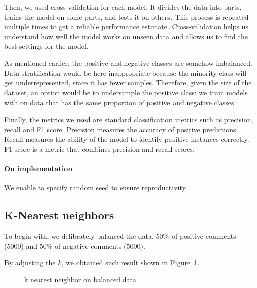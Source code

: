 \documentclass{article}
\begin{document}
Then, we used cross-validation for each model. It divides the data into parts, trains the model on some parts, and tests it on others. This process is repeated multiple times to get a reliable performance estimate. Cross-validation helps us understand how well the model works on unseen data and allows us to find the best settings for the model.

As mentioned earlier, the positive and negative classes are somehow imbalanced. Data stratification would be here inappropriate because the minority class will get underrepresented, since it has fewer samples.
Therefore, given the size of the dataset, an option would be to undersample the positive class: we train models with on data that has the same proportion of positive and negative classes.

Finally, the metrics we used are standard classification metrics such as precision, recall and F1 score.
Precision measures the accuracy of positive predictions. Recall measures the ability of the model to identify positive instances correctly. F1-score is a metric that combines precision and recall scores.

\paragraph{On implementation} We enable to specify random seed to ensure reproductivity.

\subsection{K-Nearest neighbors}

To begin with, we delibrately balanced the data, 50\% of positive comments (5000)
and 50\% of negative comments (5000).

By adjusting the $k$, we obtained such result shown in Figure~\ref{fig:KNN1}.

\begin{figure}[H]
  \centering
  \caption{k nearest neighbor on balanced data}
  \label{fig:KNN1}
\end{figure}
\end{document}
